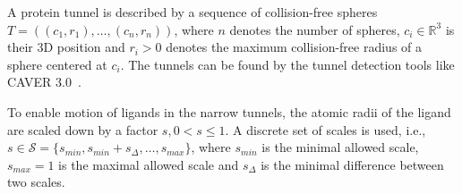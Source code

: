 \documentclass[usletter, 10pt, conference]{ieeeconf} %
\def\R{\mathbb{R}}
\def\smin{s_{min}}
\def\smax{s_{max}}
\def\sdelta{s_{\Delta}}
\def\L{\mathcal{L}}
\def\S{\mathcal{S}}
\begin{document}


A protein tunnel is described by a sequence of collision-free spheres 
$T=( (c_1, r_1),\ldots,(c_n,r_n) )$, where $n$ denotes the number of spheres,
$c_i \in \R^3$ is their 3D position and $r_i > 0$ denotes the maximum collision-free radius of a sphere centered at $c_i$. 
The tunnels can be found by the tunnel detection tools like CAVER 3.0~\cite{caver3}.



To enable motion of ligands in the narrow tunnels, the atomic radii of the ligand are scaled down by a factor $s, 0 < s \le 1$.
A discrete set of scales is used, i.e., $s \in \S=\{\smin, \smin+\sdelta, \ldots, \smax\}$, where 
$\smin$ is the minimal allowed scale, $\smax=1$ is the maximal allowed scale and $\sdelta$ is the minimal difference between two scales.
\end{document}
